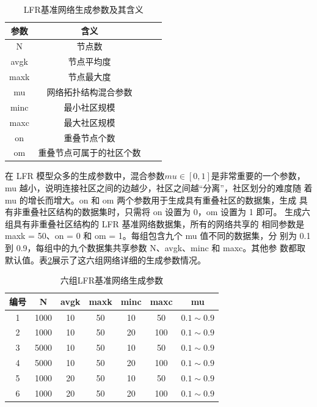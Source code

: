 \begin{table}
  \centering
  \caption{LFR基准网络生成参数及其含义} \label{tab:tab3-4}
  \begin{tabular*}{0.9\textwidth}{@{\extracolsep{\fill}}cccc}
  \toprule
    参数		&含义\\
  \midrule
    N  &节点数\\
    avgk	&节点平均度\\ 
    maxk  &节点最大度\\
    mu  &网络拓扑结构混合参数\\
    minc  &最小社区规模\\
    maxc  &最大社区规模 \\
    on    &重叠节点个数\\
    om    &重叠节点可属于的社区个数\\
  \bottomrule
  \end{tabular*}
\end{table}

在 LFR 模型众多的生成参数中，混合参数$ mu \in [0,1]$是非常重要的一个参数，
mu 越小，说明连接社区之间的边越少，社区之间越“分离”，社区划分的难度随
着 mu 的增长而增大。on 和 om 两个参数用于生成具有重叠社区的数据集，生成
具有非重叠社区结构的数据集时，只需将 on 设置为 0，om 设置为 1 即可。 
生成六组具有非重叠社区结构的 LFR 基准网络数据集，所有的网络共享的
相同参数是 maxk = 50、on = 0 和 om = 1。每组包含九个 mu 值不同的数据集，分
别为 0.1 到 0.9，每组中的九个数据集共享参数 N、avgk、minc 和 maxc。其他参
数都取默认值。表\ref{tab:tab3-5}展示了这六组网络详细的生成参数情况。 

\begin{table}
  \centering
  \caption{六组LFR基准网络生成参数} \label{tab:tab3-5}
  \begin{tabular*}{0.9\textwidth}{@{\extracolsep{\fill}}ccccccc}
  \toprule
    编号		&N  &avgk &maxk &minc &maxc &mu\\
  \midrule
    1	&1000  &10 &50 &10 &50 &$0.1\sim 0.9$\\
    2 &1000  &10 &50 &20 &100 &$0.1\sim 0.9$\\
    3 &5000  &10 &50 &10 &50 &$0.1\sim 0.9$\\
    4 &5000  &10 &50 &20 &100 &$0.1\sim 0.9$\\
    5 &1000  &20 &50 &10 &50 &$0.1\sim 0.9$\\
    6 &1000  &20 &50 &20 &100 &$0.1\sim 0.9$\\
  \bottomrule
  \end{tabular*}
\end{table}

